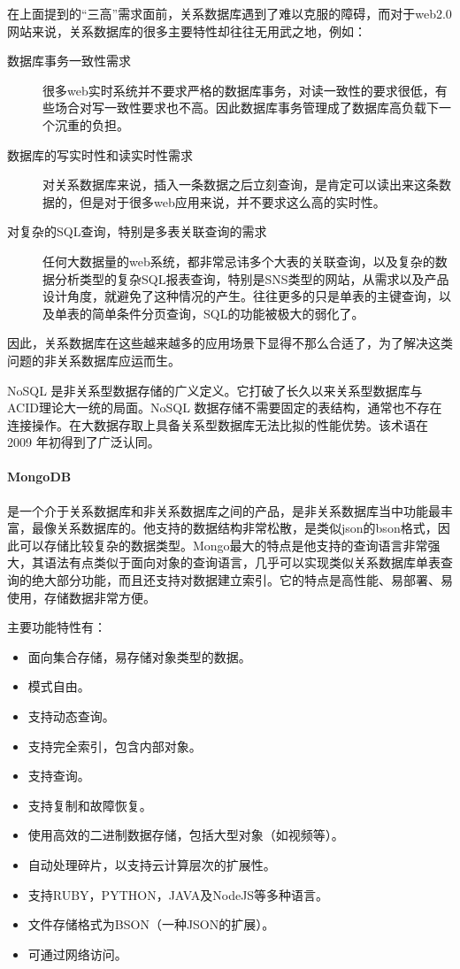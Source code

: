 \noindent
在上面提到的“三高”需求面前，关系数据库遇到了难以克服的障碍，而对于web2.0网站来说，关系数据库的很多主要特性却往往无用武之地，例如：

\begin{description}
    \item[数据库事务一致性需求] 很多web实时系统并不要求严格的数据库事务，对读一致性的要求很低，有些场合对写一致性要求也不高。因此数据库事务管理成了数据库高负载下一个沉重的负担。
    \item[数据库的写实时性和读实时性需求] 对关系数据库来说，插入一条数据之后立刻查询，是肯定可以读出来这条数据的，但是对于很多web应用来说，并不要求这么高的实时性。
    \item[对复杂的SQL查询，特别是多表关联查询的需求] 任何大数据量的web系统，都非常忌讳多个大表的关联查询，以及复杂的数据分析类型的复杂SQL报表查询，特别是SNS类型的网站，从需求以及产品设计角度，就避免了这种情况的产生。往往更多的只是单表的主键查询，以及单表的简单条件分页查询，SQL的功能被极大的弱化了。
\end{description}

\noindent
因此，关系数据库在这些越来越多的应用场景下显得不那么合适了，为了解决这类问题的非关系数据库应运而生。

NoSQL 是非关系型数据存储的广义定义。它打破了长久以来关系型数据库与ACID理论大一统的局面。NoSQL 数据存储不需要固定的表结构，通常也不存在连接操作。在大数据存取上具备关系型数据库无法比拟的性能优势。该术语在 2009 年初得到了广泛认同。

\paragraph{MongoDB}
是一个介于关系数据库和非关系数据库之间的产品，是非关系数据库当中功能最丰富，最像关系数据库的。他支持的数据结构非常松散，是类似json的bson格式，因此可以存储比较复杂的数据类型。Mongo最大的特点是他支持的查询语言非常强大，其语法有点类似于面向对象的查询语言，几乎可以实现类似关系数据库单表查询的绝大部分功能，而且还支持对数据建立索引。它的特点是高性能、易部署、易使用，存储数据非常方便。

\clearpage
\noindent
主要功能特性有：
\begin{itemize}
  \item 面向集合存储，易存储对象类型的数据。
  \item 模式自由。
  \item 支持动态查询。
  \item 支持完全索引，包含内部对象。
  \item 支持查询。
  \item 支持复制和故障恢复。
  \item 使用高效的二进制数据存储，包括大型对象（如视频等）。
  \item 自动处理碎片，以支持云计算层次的扩展性。
  \item 支持RUBY，PYTHON，JAVA及NodeJS等多种语言。
  \item 文件存储格式为BSON（一种JSON的扩展）。
  \item 可通过网络访问。
\end{itemize}

